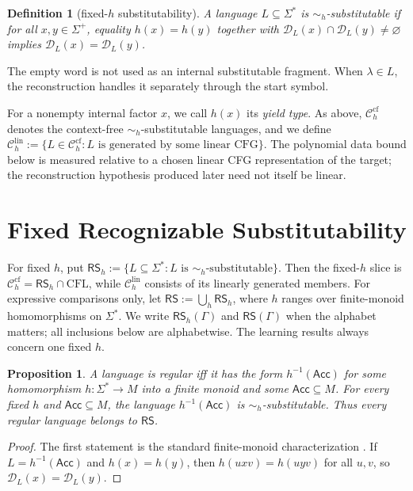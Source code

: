 \documentclass[11pt,a4paper]{article}
\newtheorem{proposition}[theorem]{Proposition}
\newtheorem{definition}[theorem]{Definition}
\theoremstyle{remark}
\theoremstyle{plain}
\newcommand{\D}{\mathcal{D}}
\newcommand{\cf}{\mathrm{cf}}
\newcommand{\lin}{\mathrm{lin}}
\newcommand{\Ccf}[1]{\mathcal C_{#1}^{\cf}}
\newcommand{\Clin}[1]{\mathcal C_{#1}^{\lin}}
\begin{document}
\begin{definition}[fixed-$h$ substitutability]\label{def:hsubst}
A language $L\subseteq\Sigma^*$ is \emph{$\sim_h$-substitutable} if for all
$x,y\in\Sigma^+$, equality $h(x)=h(y)$ together with
$\D_L(x)\cap\D_L(y)\ne\varnothing$ implies $\D_L(x)=\D_L(y)$.
\end{definition}
The empty word is not used as an internal substitutable fragment.  When
$\lambda\in L$, the reconstruction handles it separately through the start
symbol.

For a nonempty internal factor $x$, we call $h(x)$ its
\emph{yield type}.  As above, $\Ccf{h}$ denotes the context-free
$\sim_h$-substitutable languages, and we define
$\Clin{h}:=\{L\in\Ccf{h}:L\text{ is generated by some linear CFG}\}$.
The polynomial data bound below is measured relative to a chosen linear CFG
representation of the target; the reconstruction hypothesis produced later
need not itself be linear.

\section{Fixed Recognizable Substitutability}
\label{sec:framework}

For fixed $h$, put
$\mathsf{RS}_h:=\{L\subseteq\Sigma^*:L\text{ is $\sim_h$-substitutable}\}$.
Then the fixed-$h$ slice is
$\Ccf{h}=\mathsf{RS}_h\cap\mathrm{CFL}$, while $\Clin{h}$ consists
of its linearly generated members.  For expressive comparisons only, let
$\mathsf{RS}:=\bigcup_h\mathsf{RS}_h$, where $h$ ranges over finite-monoid
homomorphisms on $\Sigma^*$.  We write $\mathsf{RS}_h(\Gamma)$ and
$\mathsf{RS}(\Gamma)$ when the alphabet matters; all inclusions below are
alphabetwise.  The learning results always concern one fixed $h$.

\begin{proposition}\label{prop:regular-auto}
A language is regular iff it has the form $h^{-1}(\mathsf{Acc})$ for some
homomorphism $h:\Sigma^*\to M$ into a finite monoid and some
$\mathsf{Acc}\subseteq M$.  For every fixed $h$ and
$\mathsf{Acc}\subseteq M$, the language $h^{-1}(\mathsf{Acc})$ is
$\sim_h$-substitutable.  Thus every regular language belongs to
$\mathsf{RS}$.
\end{proposition}

\begin{proof}
The first statement is the standard finite-monoid characterization
\cite{pin2025}.  If $L=h^{-1}(\mathsf{Acc})$ and $h(x)=h(y)$, then
$h(uxv)=h(uyv)$ for all $u,v$, so $\D_L(x)=\D_L(y)$.
\end{proof}
\end{document}
